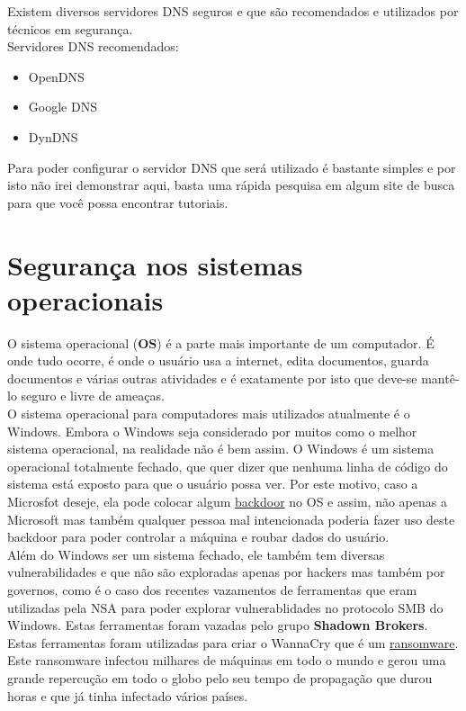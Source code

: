 \documentclass[12pt, letterpaper]{report}
\begin{document}
	Existem diversos servidores DNS seguros e que são recomendados e utilizados por técnicos em segurança.\\

	Servidores DNS recomendados:

	\begin{itemize} %
		\item OpenDNS
		\item Google DNS
		\item DynDNS
%
	\end{itemize} %

	Para poder configurar o servidor DNS que será utilizado é bastante simples e por isto não irei demonstrar aqui, basta uma rápida pesquisa em algum site de busca para que você possa encontrar tutoriais.\\

\pagebreak

\section*{Segurança nos sistemas operacionais}
	O sistema operacional (\textbf{OS}) é a parte mais importante de um computador. É onde tudo ocorre, é onde o usuário usa a internet, edita documentos, guarda documentos e várias outras atividades e é exatamente por isto que deve-se mantê-lo seguro e livre de ameaças.\\

	O sistema operacional para computadores mais utilizados atualmente é o Windows. Embora o Windows seja considerado por muitos como o melhor sistema operacional, na realidade não é bem assim. O Windows é um sistema operacional totalmente fechado, que quer dizer que nenhuma linha de código do sistema está exposto para que o usuário possa ver. Por este motivo, caso a Microsfot  deseje, ela pode colocar algum \href{https://criptowiki.miraheze.org/wiki/Backdoors}{backdoor} no OS e assim, não apenas a Microsoft mas também qualquer pessoa mal intencionada poderia fazer uso deste backdoor para poder controlar a máquina e roubar dados do usuário.\\

	Além do Windows ser um sistema fechado, ele também tem diversas vulnerabilidades e que não são exploradas apenas por hackers mas também por governos, como é o caso dos recentes vazamentos de ferramentas que eram utilizadas pela NSA para poder explorar vulnerablidades no protocolo SMB do Windows. Estas ferramentas foram vazadas pelo grupo \textbf{Shadown Brokers}. Estas ferramentas foram utilizadas para criar o WannaCry que é um \href{https://criptowiki.miraheze.org/wiki/Ransomwares}{ransomware}. Este ransomware infectou milhares de máquinas em todo o mundo e gerou uma grande repercução em todo o globo pelo seu tempo de propagação que durou horas e que já tinha infectado vários países.\\
\end{document}
